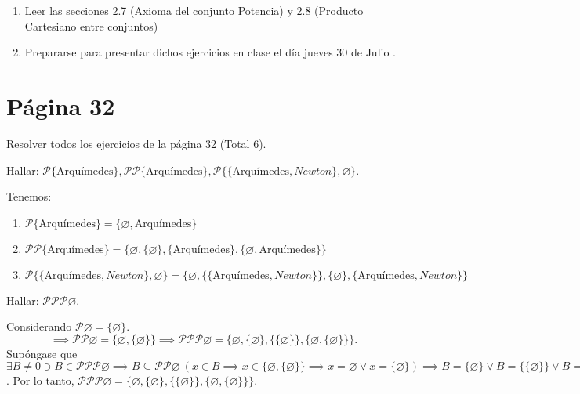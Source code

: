 





\begin{enumerate}
	\item Leer las secciones 2.7 (Axioma del conjunto Potencia) y 2.8 (Producto Cartesiano entre conjuntos)
	\item Prepararse para presentar dichos ejercicios en clase el día jueves 30 de Julio .
\end{enumerate}
\section{Página 32}
	Resolver todos los ejercicios de la página 32 (Total 6).
	
	\begin{problema}
		Hallar: $\mathcal{P}\{\text{Arquímedes} \}, \mathcal{P}\mathcal{P}\{\text{Arquímedes} \}, \mathcal{P}\{\{\text{Arquímedes}, Newton \},\varnothing \}$.
	\end{problema}
	\begin{sol}
		Tenemos: 
		\begin{enumerate}
			\item $\mathcal{P}\{\text{Arquímedes} \}=\{\varnothing, \text{Arquímedes} \}$
			\item $\mathcal{P}\mathcal{P}\{\text{Arquímedes} \}=\{\varnothing,\{\varnothing\},\{\text{Arquímedes} \},  \{\varnothing, \text{Arquímedes} \}\}$
			\item $\mathcal{P}\{\{\text{Arquímedes}, Newton \},\varnothing \}=\{\varnothing,\{\{\text{Arquímedes}, Newton \}\}, \{\varnothing\}, \{\text{Arquímedes}, Newton \}\}$
		\end{enumerate}
	\end{sol}


	\begin{problema}
	Hallar: $\mathcal{P}\mathcal{P}\mathcal{P}\varnothing$.
\end{problema}
\begin{sol}
	Considerando $\mathcal{P}\varnothing =\{\varnothing\}$. 
	$$\implies \mathcal{P}\mathcal{P}\varnothing= \{\varnothing,\{\varnothing\}\}\implies \mathcal{P}\mathcal{P}\mathcal{P}\varnothing= \{\varnothing,\{\varnothing\},\{\{\varnothing\}\}, \{\varnothing,\{\varnothing\}\} \}. $$
	Supóngase que $\exists B\neq 0 \ni B\in \mathcal{P}\mathcal{P}\mathcal{P}\varnothing\implies  B\subseteq\mathcal{P}\mathcal{P}\varnothing \ (x\in B\implies x\in \{\varnothing,\{\varnothing\}\}\implies x=\varnothing \vee x=\{\varnothing\})\implies B=\{\varnothing\}\vee B=\{\{\varnothing\}\}\vee B=\{\varnothing,\{\varnothing\}\}$. Por lo tanto, $\mathcal{P}\mathcal{P}\mathcal{P}\varnothing= \{\varnothing,\{\varnothing\},\{\{\varnothing\}\}, \{\varnothing,\{\varnothing\}\} \}$. 
\end{sol}

